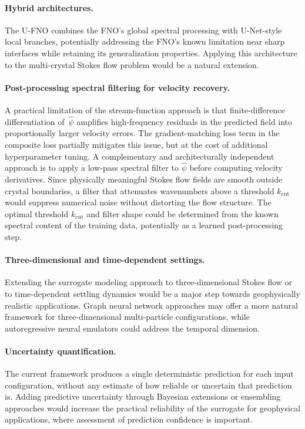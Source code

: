 \paragraph{Hybrid architectures.}
The U-FNO \parencite{wen_u-fnoenhanced_2022} combines the FNO's global spectral processing with U-Net-style local branches, potentially addressing the FNO's known limitation near sharp interfaces while retaining its generalization properties. Applying this architecture to the multi-crystal Stokes flow problem would be a natural extension.

\paragraph{Post-processing spectral filtering for velocity recovery.}
A practical limitation of the stream-function approach is that finite-difference differentiation of~$\hat\psi$ amplifies high-frequency residuals in the predicted field into proportionally larger velocity errors. The gradient-matching loss term in the composite loss partially mitigates this issue, but at the cost of additional hyperparameter tuning. A complementary and architecturally independent approach is to apply a low-pass spectral filter to $\hat\psi$ before computing velocity derivatives. Since physically meaningful Stokes flow fields are smooth outside crystal boundaries, a filter that attenuates wavenumbers above a threshold $k_\text{cut}$ would suppress numerical noise without distorting the flow structure. The optimal threshold $k_\text{cut}$ and filter shape could be determined from the known spectral content of the training data, potentially as a learned post-processing step.

\paragraph{Three-dimensional and time-dependent settings.}
Extending the surrogate modeling approach to three-dimensional Stokes flow or to time-dependent settling dynamics would be a major step towards geophysically realistic applications. Graph neural network approaches \parencite{sanchez-gonzalez_learning_nodate} may offer a more natural framework for three-dimensional multi-particle configurations, while autoregressive neural emulators \parencite{koehler_apebench_nodate} could address the temporal dimension.

\paragraph{Uncertainty quantification.}
The current framework produces a single deterministic prediction for each input configuration, without any estimate of how reliable or uncertain that prediction is. Adding predictive uncertainty through Bayesian extensions \parencite{zhu_bayesian_2018} or ensembling approaches would increase the practical reliability of the surrogate for geophysical applications, where assessment of prediction confidence is important.
